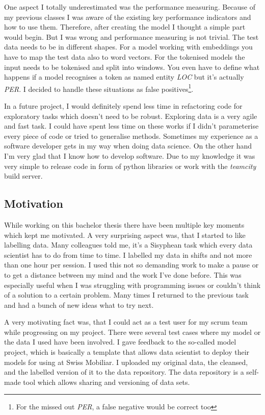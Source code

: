 One aspect I totally underestimated was the performance measuring. Because of my previous classes I was aware of the existing key performance indicators and how to use them. Therefore, after creating the model I thought a simple part would begin. But I was wrong and performance measuring is not trivial. The test data needs to be in different shapes. For a model working with embeddings you have to map the test data also to word vectors. For the tokenised models the input needs to be tokenised and split into windows. You even have to define what happens if a model recognises a token as named entity \emph{LOC} but it's actually \emph{PER}. I decided to handle these situations as false positives\footnote{For the missed out \emph{PER}, a false negative would be correct too}.

In a future project, I would definitely spend less time in refactoring code for exploratory tasks which doesn't need to be robust. Exploring data is a very agile and fast task. I could have spent less time on these works if I didn't parameterise every piece of code or tried to generalise methods. Sometimes my experience as a software developer gets in my way when doing data science. On the other hand I'm very glad that I know how to develop software. Due to my knowledge it was very simple to release code in form of python libraries or work with the \emph{teamcity} build server.

\subsection{Motivation}

While working on this bachelor thesis there have been multiple key moments which kept me motivated. A very surprising aspect was, that I started to like labelling data. Many colleagues told me, it's a Sisyphean task which every data scientist has to do from time to time. I labelled my data in shifts and not more than one hour per session. I used this not so demanding work to make a pause or to get a distance between my mind and the work I've done before. This was especially useful when I was struggling with programming issues or couldn't think of a solution to a certain problem. Many times I returned to the previous task and had a bunch of new ideas what to try next.

A very motivating fact was, that I could act as a test user for my scrum team while progressing on my project. There were several test cases where my model or the data I used have been involved. I gave feedback to the so-called model project, which is basically a template that allows data scientist to deploy their models for using at Swiss Mobiliar. I uploaded my original data, the cleansed, and the labelled version of it to the data repository. The data repository is a self-made tool which allows sharing and versioning of data sets.

